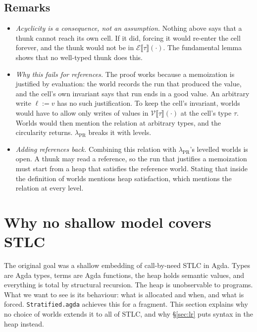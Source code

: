 \documentclass[11pt]{article}
\newcommand{\assign}{\mathrel{:=}}
\newcommand{\Vrel}[2]{\mathcal{V}\llbracket #1 \rrbracket(#2)}
\newcommand{\Erel}[2]{\mathcal{E}\llbracket #1 \rrbracket(#2)}
\begin{document}
\subsection{Remarks}

\begin{itemize}
  \item \emph{Acyclicity is a consequence, not an assumption.} Nothing above
    says that a thunk cannot reach its own cell. If it did, forcing it would
    re-enter the cell forever, and the thunk would not be in
    $\Erel{\tau}{\cdot}$. The fundamental lemma shows that no well-typed
    thunk does this.
  \item \emph{Why this fails for references.} The proof works because a
    memoization is justified by evaluation: the world records the run
    that produced the value, and the cell's own invariant says that run ends
    in a good value. An arbitrary write $\ell \assign v$ has no such
    justification. To keep the cell's invariant, worlds would have to
    allow only writes of values in $\Vrel{\tau}{\cdot}$ at the cell's type
    $\tau$. Worlds would then mention the relation at arbitrary types, and
    the circularity returns. $\lambda_{\mathrm{PR}}$ breaks it with levels.
  \item \emph{Adding references back.} Combining this relation with
    $\lambda_{\mathrm{PR}}$'s levelled worlds is open. A thunk may read a
    reference, so the run that justifies a memoization must start from a heap
    that satisfies the reference world. Stating that inside the definition of
    worlds mentions heap satisfaction, which mentions the relation at
    every level.
\end{itemize}

\section{Why no shallow model covers STLC}
\label{sec:obstruction}

The original goal was a shallow embedding of call-by-need STLC in Agda.
Types are Agda types, terms are Agda functions, the heap holds semantic
values, and everything is total by structural recursion. The heap is
unobservable to programs. What we want to see is its behaviour: what is
allocated and when, and what is forced. \texttt{Stratified.agda} achieves this
for a fragment. This section explains why no choice of worlds extends it to
all of STLC, and why \S\ref{sec:lr} puts syntax in the heap instead.
\end{document}
